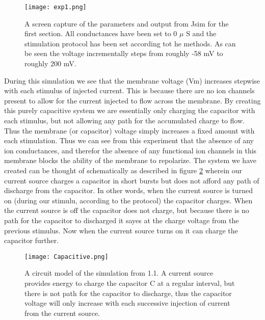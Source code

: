 \documentclass[12pt]{article}
\begin{document}
\begin{figure}[H]
	\centering
	\centering
	\texttt{[image: exp1.png]}
	
	\caption{A screen capture of the parameters and output from Jsim for the first section. All conductances have been set to 0 \ensuremath{\mu} S and the stimulation protocol has been set according tot he methods. As can be seen the voltage incrementally steps from roughly -58 mV to roughly 200 mV. }
	\label{fig:exp1.1}
\end{figure}
\par{}
During this simulation we see that the membrane voltage (Vm) increases stepwise with each stimulus of injected current. This is because there are no ion channels present to allow for the current injected to flow across the membrane. By creating this purely capacitive system we are essentially only charging the capacitor with each stimulus, but not allowing any path for the accumulated charge to flow. Thus the membrane (or capacitor) voltage simply increases a fixed amount with each stimulation. Thus we can see from this experiment that the absence of any ion conductances, and therefor the absence of any functional ion channels in this membrane blocks the ability of the membrane to repolarize. The system we have created can be thought of schematically as described in figure \ref{fig:exp1.cmodel} wherein our current source charges a capacitor in short bursts but does not afford any path of discharge from the capacitor. In other words, when the current source is turned on (during our stimulu, according to the protocol) the capacitor charges. When the current source is off the capacitor does not charge, but because there is no path for the capacitor to discharged it sayes at the charge voltage from the previous stimulus. Now when the current source turns on it can charge the capacitor further.


\begin{figure}[H]
	\centering
	\centering
	\texttt{[image: Capacitive.png]}
	
	\caption{A circuit model of the simulation from 1.1. A current source provides energy to charge the capacitor C at a regular interval, but there is not path for the capacitor to discharge, thus the capacitor voltage will only increase with each successive injection of current from the current source. }
	\label{fig:exp1.cmodel}
\end{figure}	
\end{document}
